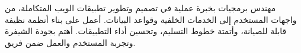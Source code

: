
\begin{cvparagraph}
مهندس برمجيات بخبرة عملية في تصميم وتطوير تطبيقات الويب المتكاملة، من واجهات
المستخدم إلى الخدمات الخلفية وقواعد البيانات. أعمل على بناء أنظمة نظيفة قابلة
للصيانة، وأتمتة خطوط التسليم، وتحسين أداء التطبيقات. أهتم بجودة الشيفرة وتجربة
المستخدم والعمل ضمن فريق.
\end{cvparagraph}

